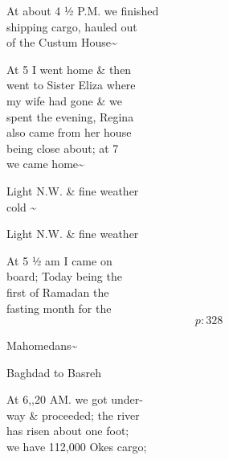 \documentclass{report}
\begin{document}
	\par{
 	At about 4 ½ P.M. we finished\ \\shipping cargo, hauled out\ \\of the Custum House\~{}\ \\
	}

	\par{
 	At 5 I went home \& then\ \\went to Sister Eliza where\ \\my wife had gone \& we\ \\spent the evening, Regina\ \\also came from her house\ \\being close about; at 7\ \\we came home\~{}\ \\
	}

	\par{
 	Light N.W. \& fine weather\ \\cold \~{}\ \\
	}

	\par{
 	Light N.W. \& fine weather\ \\
	}

	\par{
 	At 5 ½ am I came on\ \\board; Today being the\ \\first of Ramadan the\ \\fasting month for the\ \\
  \[p: 328 \]

	}







	\par{
 	Mahomedans\~{}\ \\
	}

	\par{
 	Baghdad to Basreh\ \\
	}

	\par{
 	At 6,,20 AM. we got under-\ \\way \& proceeded; the river\ \\has risen about one foot;\ \\we have 112,000 Okes cargo;\ \\
	}
\end{document}
